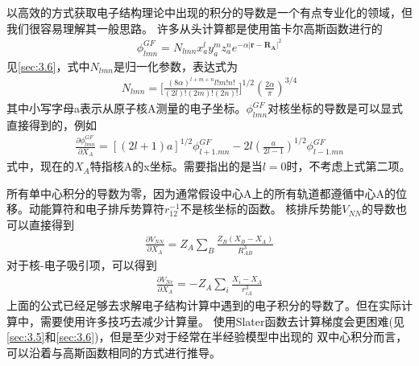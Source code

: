 以高效的方式获取电子结构理论中出现的积分的导数是一个有点专业化的领域，但我们很容易理解其一般思路。
许多从头计算都是使用笛卡尔高斯函数进行的
\begin{align}
	\nonumber
    \phi_{lmn}^{GF}=N_{lmn}x_{a}^{l}y_{a}^{m}z_{a}^{n} e^{-\alpha|\mathbf{r}-\mathbf{R_{A}}|^2} 
\end{align}
见\autoref{sec:3.6}，式中$N_{lmn}$是归一化参数，表达式为
\begin{align}
	\nonumber
    N_{lmn}=\bigg[\frac{(8\alpha)^{l+m+n}l!m!n!}{(2l)!(2m)!(2n)!} \bigg]^{1/2}(\frac{2\alpha}{\pi})^{3/4}
\end{align}
其中小写字母a表示从原子核A测量的电子坐标。$\phi_{lmn}^{GF}$对核坐标的导数是可以显式直接得到的，例如
\begin{align}
	\nonumber
    \frac{\partial \phi_{lmn}^{GF}}{\partial X_A}=[(2l+1)a]^{1/2}\phi_{l+1.mn}^{GF}-2l(\frac{a}{2l-1})^{1/2}\phi_{l-1.mn}^{GF}
\end{align}
式中，现在的$X_A$特指核A的x坐标。需要指出的是当$l=0$时，不考虑上式第二项。

所有单中心积分的导数为零，因为通常假设中心A上的所有轨道都遵循中心A的位移。动能算符和电子排斥势算符$r_{12}^{-1}$不是核坐标的函数。
核排斥势能$V_{NN}$的导数也可以直接得到
\begin{align}
	\nonumber
    \frac{\partial V_{NN}}{\partial X_A}=Z_A\sum_{B}\frac{Z_B(X_B-X_A)}{R_{AB}^{3}}
\end{align}
对于核-电子吸引项，可以得到
\begin{align}
	\nonumber
    \frac{\partial V_{Ne}}{\partial X_A}=-Z_A\sum_{i}\frac{X_i-X_A}{r_{iA}^{3}}
\end{align}
上面的公式已经足够去求解电子结构计算中遇到的电子积分的导数了。但在实际计算中，需要使用许多技巧去减少计算量。
使用Slater函数去计算梯度会更困难(见\autoref{sec:3.5}和\autoref{sec:3.6})，但是至少对于经常在半经验模型中出现的
双中心积分而言，可以沿着与高斯函数相同的方式进行推导。

